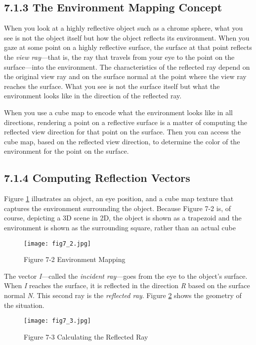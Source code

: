 \documentclass[../main.tex]{subfiles}
\begin{document}
\subsection{7.1.3 The Environment Mapping Concept}

When you look at a highly reflective object such as a chrome sphere, what you see is not the object itself but how the object reflects its environment. When you gaze at some point on a highly reflective surface, the surface at that point reflects the \textit{view ray}—that is, the ray that travels from your eye to the point on the surface—into the environment. The characteristics of the reflected ray depend on the original view ray and on the surface normal at the point where the view ray reaches the surface. What you see is not the surface itself but what the environment looks like in the direction of the reflected ray.

When you use a cube map to encode what the environment looks like in all directions, rendering a point on a reflective surface is a matter of computing the reflected view direction for that point on the surface. Then you can access the cube map, based on the reflected view direction, to determine the color of the environment for the point on the surface.

\subsection{7.1.4 Computing Reflection Vectors}

Figure \ref{fig:7-2} illustrates an object, an eye position, and a cube map texture that captures the environment surrounding the object. Because Figure 7-2 is, of course, depicting a 3D scene in 2D, the object is shown as a trapezoid and the environment is shown as the surrounding square, rather than an actual cube

\begin{figure}
    \centering
    \texttt{[image: fig7\_2.jpg]}
    \caption{Figure 7-2 Environment Mapping}
    \label{fig:7-2}
\end{figure}

The vector \textit{I}—called the \textit{incident ray}—goes from the eye to the object's surface. When \textit{I} reaches the surface, it is reflected in the direction \textit{R} based on the surface normal \textit{N}. This second ray is the \textit{reflected ray}. Figure \ref{fig:7-3} shows the geometry of the situation.

\begin{figure}
    \centering
    \texttt{[image: fig7\_3.jpg]}
    \caption{Figure 7-3 Calculating the Reflected Ray}
    \label{fig:7-3}
\end{figure}
\end{document}

